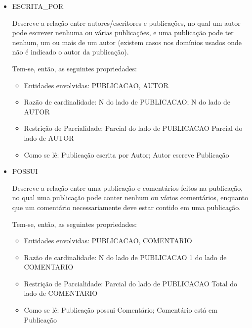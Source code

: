 \begin{itemize}

				\item ESCRITA\_POR

Descreve a relação entre autores/escritores e publicações, no qual um autor pode escrever nenhuma ou várias publicações, e uma publicação pode ter nenhum, um ou mais de um autor (existem casos nos domínios usados onde não é indicado o autor da publicação).

Tem-se, então, as seguintes propriedades:

\begin{itemize}

				\item Entidades envolvidas: PUBLICACAO, AUTOR
				\item Razão de cardinalidade:     N do lado de PUBLICACAO;  N do lado de AUTOR
				\item Restrição de Parcialidade: Parcial do lado de PUBLICACAO                        Parcial do lado de AUTOR
				\item Como se lê: Publicação escrita por Autor; Autor escreve Publicação
\end{itemize}
\end{itemize}

\begin{itemize}
				\item POSSUI

Descreve a relação entre uma publicação e comentários feitos na publicação, no qual uma publicação pode conter nenhum ou vários comentários, enquanto que um comentário necessariamente deve estar contido em uma publicação.

Tem-se, então, as seguintes propriedades:
\begin{itemize}
				\item Entidades envolvidas: PUBLICACAO, COMENTARIO
				\item Razão de cardinalidade:     N do lado de PUBLICACAO
                1 do lado de COMENTARIO
				\item Restrição de Parcialidade: Parcial do lado de PUBLICACAO                        Total do lado de COMENTARIO
				\item Como se lê: Publicação possui Comentário; Comentário está em Publicação
\end{itemize}
\end{itemize}

